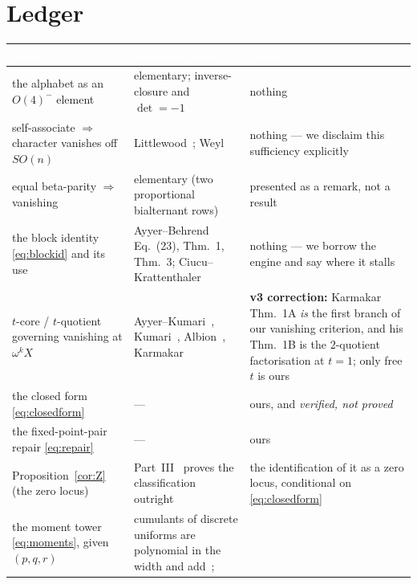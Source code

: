 \documentclass[11pt,a4paper]{article}
\begin{document}
\section{Ledger}\label{sec:ledger}

\begin{table}[!htbp]
\centering\small
\begin{tabular}{p{4.0cm}p{5.2cm}p{5.0cm}}
\toprule
\rowcolor{hdrblue}
\textcolor{white}{Item} & \textcolor{white}{Inherited (cite)} & \textcolor{white}{Ours}\\
\midrule
the alphabet as an $O(4)^-$ element &
elementary; inverse-closure and $\det=-1$ &
nothing\\
\midrule
\rowcolor{softgrey}
self-associate $\Rightarrow$ character vanishes off $SO(n)$ &
Littlewood~\cite[Ch.~XI]{LittlewoodBook}; Weyl~\cite{Weyl} &
nothing --- we disclaim this sufficiency explicitly\\
\midrule
equal beta-parity $\Rightarrow$ vanishing &
elementary (two proportional bialternant rows) &
presented as a remark, not a result\\
\midrule
\rowcolor{softgrey}
the block identity \eqref{eq:blockid} and its use &
Ayyer--Behrend~\cite{AB} Eq.~(23), Thm.~1, Thm.~3; Ciucu--Krattenthaler~\cite{CK} &
nothing --- we borrow the engine and say where it stalls\\
\midrule
$t$-core / $t$-quotient governing vanishing at $\omega^kX$ &
Ayyer--Kumari~\cite{AK}, Kumari~\cite{Kumari}, Albion~\cite{Albion},
Karmakar~\cite{Karmakar} &
\textbf{v3 correction:} Karmakar Thm.~1A \emph{is} the first branch of our
vanishing criterion, and his Thm.~1B is the $2$-quotient factorisation at
$t=1$; only free $t$ is ours\\
\midrule
\rowcolor{softgrey}
the closed form \eqref{eq:closedform} & --- &
ours, and \emph{verified, not proved}\\
\midrule
the fixed-point-pair repair \eqref{eq:repair} & --- & ours\\
\midrule
\rowcolor{softgrey}
Proposition~\ref{cor:Z} (the zero locus) & Part~III~\cite{PartIII} proves the classification
outright & the identification of it as a zero locus, conditional on \eqref{eq:closedform}\\
\midrule
the moment tower \eqref{eq:moments}, given $(p,q,r)$ &
cumulants of discrete uniforms are polynomial in the width and add~\cite{Neuschel};

\end{tabular}
\end{table}
\end{document}
